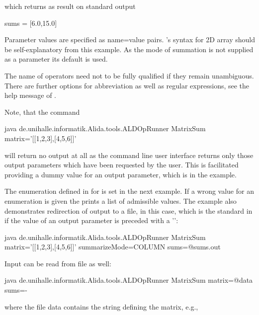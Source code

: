 which returns as result on standard output
\begin{code}
sums = [6.0,15.0]
\end{code}

Parameter values are specified as name=value pairs.
\alida's syntax for 2D array should be self-explanatory  from this example.
As the mode of summation is not supplied as a parameter its default is used.

The name of operators need not to be fully qualified if  they remain
unambiguous.
There are further options for abbreviation as well as regular expressions, see the help message of
.

Note, that the command
\begin{code}
java de.unihalle.informatik.Alida.tools.ALDOpRunner MatrixSum matrix='[[1,2,3],[4,5,6]]' 
\end{code}
will return no output at all as the command line user interface returns only  those output parameters which have been requested by the user.
This is facilitated providing a dummy value for an output parameter, which is
\icode{-} in the example.

The enumeration defined in  
for  
is set in the next example.
If a wrong value for an enumeration is given the 
prints a list of admissible values.
The example also demonstrates redirection of output
to a file,  in this case, which is the standard in \alida if the
value of an output parameter is preceded with a '':\\[0.25cm]
\begin{code}
java de.unihalle.informatik.Alida.tools.ALDOpRunner MatrixSum matrix='[[1,2,3],[4,5,6]]' 
	summarizeMode=COLUMN sums=@sums.out
\end{code}

Input can be read from file as well:
\begin{code}
java de.unihalle.informatik.Alida.tools.ALDOpRunner MatrixSum matrix=@data sums=-
\end{code}

where the file data contains the string defining the matrix, e.g.,
\icode{[[1,2,3],[4,5,6]]}


